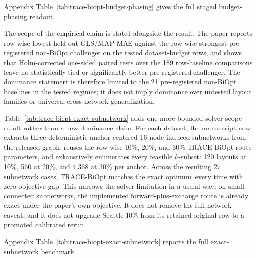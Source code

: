 Appendix Table~\ref{tab:trace-biopt-budget-phasing} gives the full staged
budget-phasing readout.

The scope of the empirical claim is stated alongside the result. The paper reports row-wise lowest held-out GLS/MAP MAE against the row-wise strongest pre-registered non-BiOpt challenger on the tested dataset-budget rows, and shows that Holm-corrected one-sided paired tests over the 189 row-baseline comparisons leave no statistically tied or significantly better pre-registered challenger. The dominance statement is therefore limited to the 21 pre-registered non-BiOpt baselines in the tested regimes; it does not imply dominance over untested layout families or universal cross-network generalization.


Table~\ref{tab:trace-biopt-exact-subnetwork} adds one more bounded solver-scope
result rather than a new dominance claim. For each dataset, the manuscript now
extracts three deterministic anchor-centered 16-node induced subnetworks from
the released graph, reuses the row-wise 10\%, 20\%, and 30\% TRACE-BiOpt route
parameters, and exhaustively enumerates every feasible $k$-subset: 120 layouts
at 10\%, 560 at 20\%, and 4,368 at 30\% per anchor. Across the resulting
27 subnetwork cases, TRACE-BiOpt matches the exact optimum every time
with zero objective gap. This narrows the solver limitation in a useful way:
on small connected subnetworks, the implemented forward-plus-exchange route is
already exact under the paper's own objective. It does not remove the
full-network caveat, and it does not upgrade Seattle 10\% from its retained
original row to a promoted calibrated rerun.

Appendix Table~\ref{tab:trace-biopt-exact-subnetwork} reports the full
exact-subnetwork benchmark.

